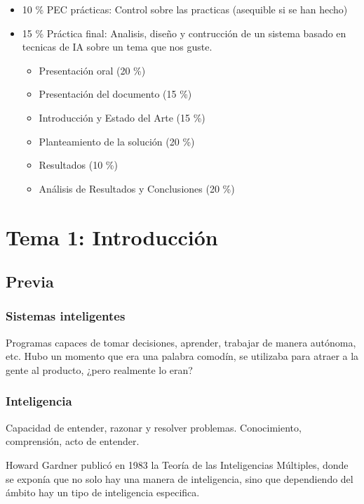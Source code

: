 \documentclass[12pt, twoside, openright]{report} %
\begin{document}
\begin{itemize}
\begin{itemize}
\begin{itemize}
		            \end{itemize}
		      \item 10 \% PEC prácticas: Control sobre las practicas (asequible si se han hecho)
		      \item 15 \% Práctica final: Analisis, diseño y contrucción de un sistema basado en tecnicas de IA sobre un tema que nos guste.
		            \begin{itemize}
			            \item Presentación oral (20 \%)
			            \item Presentación del documento (15 \%)
			            \item Introducción y Estado del Arte (15 \%)
			            \item Planteamiento de la solución (20 \%)
			            \item Resultados (10 \%)
			            \item Análisis de Resultados y Conclusiones (20 \%)
		            \end{itemize}
	      \end{itemize}
	      
\end{itemize}

\chapter{Tema 1: Introducción}
\section{Previa}
\subsection{Sistemas inteligentes}
Programas capaces de tomar decisiones, aprender, trabajar de manera autónoma, etc. Hubo un momento que era una palabra comodín, se utilizaba para atraer a la gente al producto, ¿pero realmente lo eran?

\subsection{Inteligencia}
Capacidad de entender, razonar y resolver problemas. Conocimiento, comprensión, acto de entender.

Howard Gardner publicó en 1983 la Teoría de las Inteligencias Múltiples, donde se exponía que no solo hay una manera de inteligencia, sino que dependiendo del ámbito hay un tipo de inteligencia especifica.
\begin{figure}[H]
	{\def\svgwidth{.8\textwidth}
		}
\end{figure}
\end{document}
